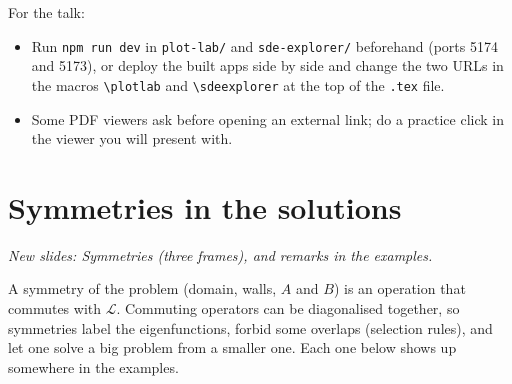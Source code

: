 \documentclass[11pt]{article}
\newcommand{\Lop}{\mathcal{L}}
\begin{document}
For the talk:
\begin{itemize}
  \item Run \texttt{npm run dev} in \texttt{plot-lab/} and \texttt{sde-explorer/} beforehand (ports 5174 and 5173), or
        deploy the built apps side by side and change the two URLs in the macros \verb|\plotlab| and \verb|\sdeexplorer| at
        the top of the \texttt{.tex} file.
  \item Some PDF viewers ask before opening an external link; do a practice click in the viewer you will present with.
\end{itemize}

\section{Symmetries in the solutions}
\emph{New slides: Symmetries (three frames), and remarks in the examples.}

A symmetry of the problem (domain, walls, $A$ and $B$) is an operation that commutes with $\Lop$. Commuting operators can be
diagonalised together, so symmetries label the eigenfunctions, forbid some overlaps (selection rules), and let one solve a
big problem from a smaller one. Each one below shows up somewhere in the examples.
\end{document}

